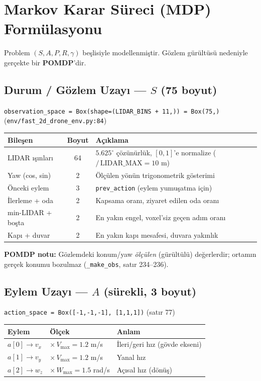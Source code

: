 \documentclass[11pt,a4paper]{article}
\begin{document}
\section{Markov Karar Süreci (MDP) Formülasyonu}
Problem $(S, A, P, R, \gamma)$ beşlisiyle modellenmiştir. Gözlem gürültüsü
nedeniyle gerçekte bir \textbf{POMDP}'dir.

\subsection{Durum / Gözlem Uzayı --- $S$ (75 boyut)}
\texttt{observation\_space = Box(shape=(LIDAR\_BINS + 11,)) = Box(75,)}
(\texttt{env/fast\_2d\_drone\_env.py:84})

\begin{center}
\begin{tabular}{lcl}
\toprule
\textbf{Bileşen} & \textbf{Boyut} & \textbf{Açıklama} \\
\midrule
LIDAR ışınları & 64 & $5.625^\circ$ çözünürlük, $[0,1]$'e normalize ($/\,\text{LIDAR\_MAX}=10$ m) \\
Yaw (cos, sin) & 2 & Ölçülen yönün trigonometrik gösterimi \\
Önceki eylem & 3 & \texttt{prev\_action} (eylem yumuşatma için) \\
İlerleme + oda & 2 & Kapsama oranı, ziyaret edilen oda oranı \\
min-LIDAR + boşta & 2 & En yakın engel, voxel'siz geçen adım oranı \\
Kapı + duvar & 2 & En yakın kapı mesafesi, duvara yakınlık \\
\bottomrule
\end{tabular}
\end{center}

\noindent\textbf{POMDP notu:} Gözlemdeki konum/yaw \emph{ölçülen} (gürültülü)
değerlerdir; ortamın gerçek konumu bozulmaz
(\texttt{\_make\_obs}, satır 234--236).

\subsection{Eylem Uzayı --- $A$ (sürekli, 3 boyut)}
\texttt{action\_space = Box([-1,-1,-1], [1,1,1])} (satır 77)

\begin{center}
\begin{tabular}{lll}
\toprule
\textbf{Eylem} & \textbf{Ölçek} & \textbf{Anlam} \\
\midrule
$a[0] \rightarrow v_x$ & $\times\,V_{\max}=1.2$ m/s & İleri/geri hız (gövde ekseni) \\
$a[1] \rightarrow v_y$ & $\times\,V_{\max}=1.2$ m/s & Yanal hız \\
$a[2] \rightarrow w_z$ & $\times\,W_{\max}=1.5$ rad/s & Açısal hız (dönüş) \\
\bottomrule
\end{tabular}
\end{center}
\end{document}

